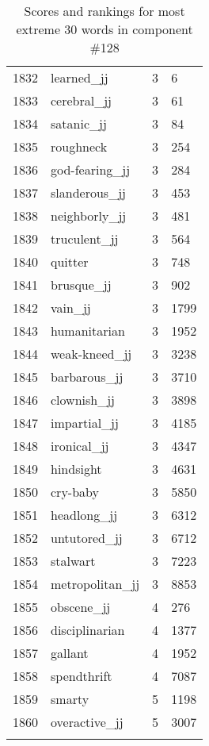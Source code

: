 \begin{longtable}[!htbp]{| rlr@{.}l |}
    1832 & learned\_jj & 3 & 6 \\
    1833 & cerebral\_jj & 3 & 61 \\
    1834 & satanic\_jj & 3 & 84 \\
    1835 & roughneck & 3 & 254 \\
    1836 & god-fearing\_jj & 3 & 284 \\
    1837 & slanderous\_jj & 3 & 453 \\
    1838 & neighborly\_jj & 3 & 481 \\
    1839 & truculent\_jj & 3 & 564 \\
    1840 & quitter & 3 & 748 \\
    1841 & brusque\_jj & 3 & 902 \\
    1842 & vain\_jj & 3 & 1799 \\
    1843 & humanitarian & 3 & 1952 \\
    1844 & weak-kneed\_jj & 3 & 3238 \\
    1845 & barbarous\_jj & 3 & 3710 \\
    1846 & clownish\_jj & 3 & 3898 \\
    1847 & impartial\_jj & 3 & 4185 \\
    1848 & ironical\_jj & 3 & 4347 \\
    1849 & hindsight & 3 & 4631 \\
    1850 & cry-baby & 3 & 5850 \\
    1851 & headlong\_jj & 3 & 6312 \\
    1852 & untutored\_jj & 3 & 6712 \\
    1853 & stalwart & 3 & 7223 \\
    1854 & metropolitan\_jj & 3 & 8853 \\
    1855 & obscene\_jj & 4 & 276 \\
    1856 & disciplinarian & 4 & 1377 \\
    1857 & gallant & 4 & 1952 \\
    1858 & spendthrift & 4 & 7087 \\
    1859 & smarty & 5 & 1198 \\
    1860 & overactive\_jj & 5 & 3007 \\
    \hline
    \caption{Scores and rankings for most extreme 30 words in component \#128} \\
\end{longtable}
